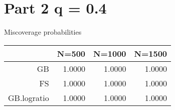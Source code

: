 \section*{Part 2 q = 0.4}


Miscoverage probabilities

\begin{tabular}{rrrr}
  \hline
 & N=500 & N=1000 & N=1500 \\ 
  \hline
GB & 1.0000 & 1.0000 & 1.0000 \\ 
  FS & 1.0000 & 1.0000 & 1.0000 \\ 
  GB.logratio & 1.0000 & 1.0000 & 1.0000 \\ 
   \hline
\end{tabular}
\vspace{0.2in}
